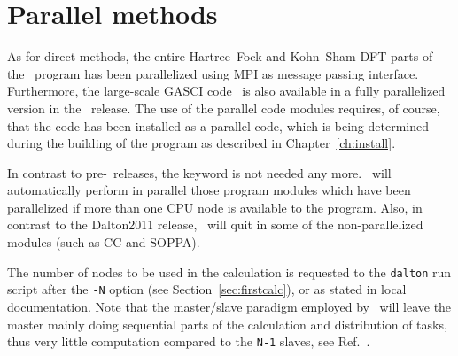 \section{Parallel methods}\label{sec:parallel}

\begin{center}
\end{center}

As for direct methods, the entire Hartree--Fock and Kohn--Sham DFT parts of the \dalton\
program has been parallelized using MPI as
message passing interface.
Furthermore, the large-scale GASCI code \lucita\ 
is also available in a fully parallelized version in the \latestrelease\ release.
The use of the parallel code modules requires,
of course, that the code has been installed as a parallel
code\index{parallel calculation}, which is
being determined during the building of the program as described in
Chapter~\ref{ch:install}.

In contrast to pre-\dalton\ releases, the keyword  is not needed any more.
\dalton\ will automatically perform in parallel those program modules which have been
parallelized if more than one CPU node is available to the program.
Also, in contrast to the Dalton2011 release, \dalton\ will quit in some of the non-parallelized
modules (such as CC and SOPPA).

%

The number of nodes to be used in the calculation is
requested to the 
\verb|dalton| run script after the \verb|-N| option (see
Section~\ref{sec:firstcalc}), or as stated in local
documentation. Note that the master/slave\index{master}
paradigm employed by 
\dalton\ will leave the master mainly doing sequential parts of the
calculation and distribution of tasks, thus very little computation
compared to the \verb|N-1| slaves, see
Ref.~\cite{pndjhapdkrthhkcpl253}.

